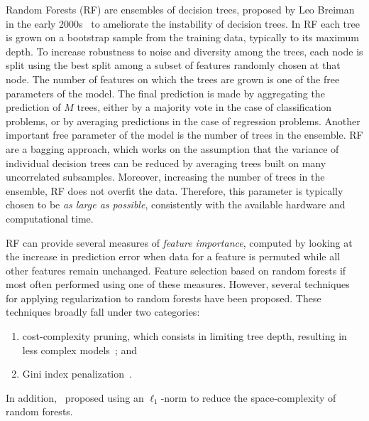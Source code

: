 	    Random Forests (\ac{RF}) are ensembles of decision trees, proposed by Leo Breiman in the early 2000s~\cite{breiman2001random} to ameliorate the instability of decision trees.
	    In RF each tree is grown on a bootstrap sample from the training data, typically to its maximum depth.
	    To increase robustness to noise and diversity among the trees, each node is split using the best split among a subset of features randomly chosen at that node. The number of features on which the trees are grown is one of the free parameters of the model.
	    The final prediction is made by aggregating the prediction of $M$ trees, either by a majority vote in the case of classification problems, or by averaging predictions in the case of regression problems.
	    Another important free parameter of the model is the number of trees in the ensemble.
	    RF are a bagging approach, which works on the assumption that the variance of individual decision trees can be reduced by averaging trees built on many uncorrelated subsamples.
	    Moreover, increasing the number of trees in the ensemble, RF does not overfit the data. Therefore, this parameter is typically chosen to be \textit{as large as possible}, consistently with the available hardware and computational time.

	    RF can provide several measures of \textit{feature importance}, computed by looking at the increase in prediction error %
	    when data for a feature is permuted while all other features remain unchanged. 
	    Feature selection based on random forests if most often performed using one of these measures. However, several techniques for applying regularization to random forests have been proposed. These techniques broadly fall under two categories:
	    \begin{enumerate}
			\item cost-complexity pruning, which consists in limiting tree depth, resulting in less complex models~\cite{ishwaran2008random,kulkarni2012pruning}; and
			\item Gini index penalization~\cite{deng2013gene, liu2014learning}.
	    \end{enumerate}
    	In addition,~\cite{joly2012ell1} proposed using an $\ell_1$-norm  to reduce the space-complexity of random forests.

